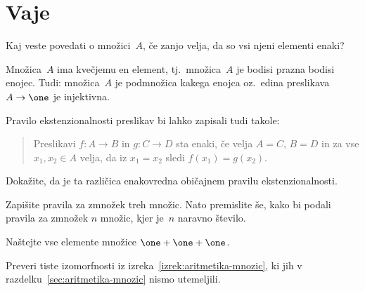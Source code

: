 \section{Vaje}

\begin{vaja}
Kaj veste povedati o množici~$A$, če zanjo velja, da so vsi njeni elementi enaki?
\begin{resitev}
Množica~$A$ ima kvečjemu en element, tj.~množica~$A$ je bodisi prazna bodisi enojec. Tudi: množica~$A$ je podmnožica kakega enojca oz.~edina preslikava $A \to \one$ je injektivna.
\end{resitev}
\end{vaja}

\begin{vaja}
  Pravilo ekstenzionalnosti preslikav bi lahko zapisali tudi takole:
  \begin{quote}
    Preslikavi $f : A \to B$ in $g : C \to D$ sta enaki, če velja $A = C$, $B = D$ in za
    vse $x_1, x_2 \in A$ velja, da iz $x_1 = x_2$ sledi $f(x_1) = g(x_2)$.
  \end{quote}
  Dokažite, da je ta različica enakovredna običajnem pravilu ekstenzionalnosti.
\end{vaja}

\begin{vaja}
  Zapišite pravila za zmnožek treh množic. Nato premislite še, kako bi podali pravila za
  zmnožek $n$ množic, kjer je~$n$ naravno število.
\end{vaja}

\begin{vaja}
  Naštejte vse elemente množice $\one + \one + \one$.
\end{vaja}

\begin{vaja}
  Preveri tiste izomorfnosti iz izreka~\ref{izrek:aritmetika-mnozic}, ki jih v
  razdelku~\ref{sec:aritmetika-mnozic} nismo utemeljili.
\end{vaja}
